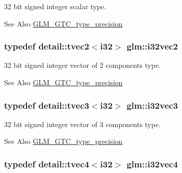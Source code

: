 32 bit signed integer scalar type. 

\begin{DoxySeeAlso}{See Also}
\hyperlink{group__gtc__type__precision}{G\-L\-M\-\_\-\-G\-T\-C\-\_\-type\-\_\-precision} 
\end{DoxySeeAlso}
\hypertarget{group__gtc__type__precision_gaa63418303dbcfc01d53f82f659eab5c1}{
\subsubsection[{i32vec2}]{\setlength{\rightskip}{0pt plus 5cm}typedef detail\-::tvec2$<$i32$>$ {\bf glm\-::i32vec2}}}\label{group__gtc__type__precision_gaa63418303dbcfc01d53f82f659eab5c1}


32 bit signed integer vector of 2 components type. 

\begin{DoxySeeAlso}{See Also}
\hyperlink{group__gtc__type__precision}{G\-L\-M\-\_\-\-G\-T\-C\-\_\-type\-\_\-precision} 
\end{DoxySeeAlso}
\hypertarget{group__gtc__type__precision_ga26740d2ca3314c87950293788455c41a}{
\subsubsection[{i32vec3}]{\setlength{\rightskip}{0pt plus 5cm}typedef detail\-::tvec3$<$i32$>$ {\bf glm\-::i32vec3}}}\label{group__gtc__type__precision_ga26740d2ca3314c87950293788455c41a}


32 bit signed integer vector of 3 components type. 

\begin{DoxySeeAlso}{See Also}
\hyperlink{group__gtc__type__precision}{G\-L\-M\-\_\-\-G\-T\-C\-\_\-type\-\_\-precision} 
\end{DoxySeeAlso}
\hypertarget{group__gtc__type__precision_gaa8d1842279485fdc4688969980e9d731}{
\subsubsection[{i32vec4}]{\setlength{\rightskip}{0pt plus 5cm}typedef detail\-::tvec4$<$i32$>$ {\bf glm\-::i32vec4}}}\label{group__gtc__type__precision_gaa8d1842279485fdc4688969980e9d731}


